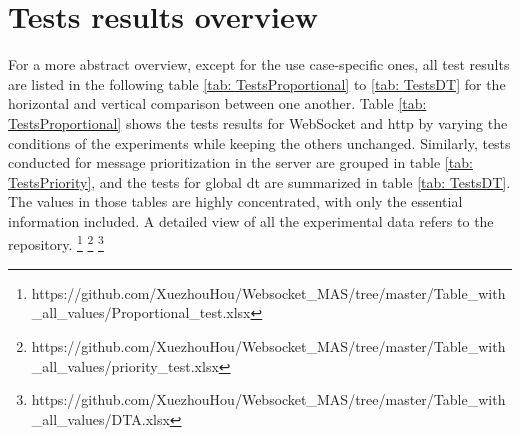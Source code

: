 \section{Tests results overview}

For a more abstract overview, except for the use case-specific ones, all 
test results are listed in the following table \ref{tab: TestsProportional} to 
\ref{tab: TestsDT} for the horizontal and vertical comparison between 
one another. Table \ref{tab: TestsProportional} shows the tests results for 
WebSocket and \gls{http} by varying the conditions of the experiments 
while keeping the others unchanged. Similarly, tests conducted for message 
prioritization in the server are grouped in table \ref{tab: TestsPriority}, 
and the tests for global \gls{dt} are summarized in table \ref{tab: TestsDT}. 
The values in those tables are highly concentrated, with only the essential 
information included. A detailed view of all the experimental data refers to 
the repository. 
\footnote[3]{https://github.com/XuezhouHou/Websocket\_MAS/tree/master/Table\_with\_all\_values/Proportional\_test.xlsx}
\footnote[4]{https://github.com/XuezhouHou/Websocket\_MAS/tree/master/Table\_with\_all\_values/priority\_test.xlsx}
\footnote[5]{https://github.com/XuezhouHou/Websocket\_MAS/tree/master/Table\_with\_all\_values/DTA.xlsx}


